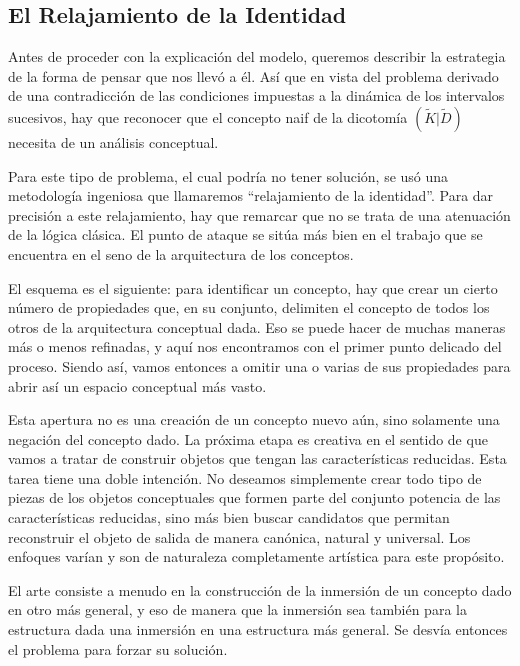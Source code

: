 \documentclass[letterpaper,12pt]{book}
\theoremstyle{definition} \newtheorem{Def}{Definición}[chapter]
\theoremstyle{definition} \newtheorem{Teo}{Teorema}[chapter]
\theoremstyle{definition} \newtheorem{Pro}{Proposición}[chapter]
\theoremstyle{definition} \newtheorem{Lema}{Lema}[chapter]
\begin{document}
\subsection{El Relajamiento de la Identidad}

Antes de proceder con la explicación del modelo, queremos describir la estrategia de la forma de pensar que nos llevó a él. Así que en vista del problema derivado de una contradicción de las condiciones impuestas a la dinámica de los intervalos sucesivos, hay que reconocer que el concepto naif de la dicotomía $(\tilde{K}| \tilde{D})$ necesita de un análisis conceptual. 

Para este tipo de problema, el cual podría no tener solución, se usó una metodología ingeniosa que llamaremos ``relajamiento de la identidad''. Para dar precisión a este relajamiento, hay que remarcar que no se trata de una atenuación de la lógica clásica. El punto de ataque se sitúa más bien en el trabajo que se encuentra en el seno de la arquitectura de los conceptos. 

El esquema es el siguiente: para identificar un concepto, hay que crear un cierto número de propiedades que, en su conjunto, delimiten el concepto de todos los otros de la arquitectura conceptual dada. Eso se puede hacer de muchas maneras más o menos refinadas, y aquí nos encontramos con el primer punto delicado del proceso. Siendo así, vamos entonces a omitir una o varias de sus propiedades para abrir así un espacio conceptual más vasto.

Esta apertura no es una creación de un concepto nuevo aún, sino solamente una negación del concepto dado. La próxima etapa es creativa en el sentido de que vamos a tratar de construir objetos que tengan las características reducidas. Esta tarea tiene una doble intención. No deseamos simplemente crear todo tipo de piezas de los objetos conceptuales que formen parte del conjunto potencia de las características reducidas, sino más bien buscar candidatos que permitan reconstruir el objeto de salida de manera canónica, natural y universal. Los enfoques varían y son de naturaleza completamente artística para este propósito.

El arte consiste a menudo en la construcción de la inmersión de un concepto dado en otro más general, y eso de manera que la inmersión sea también para la estructura dada una inmersión en una estructura más general. Se desvía entonces el problema para forzar su solución. 
\end{document}
